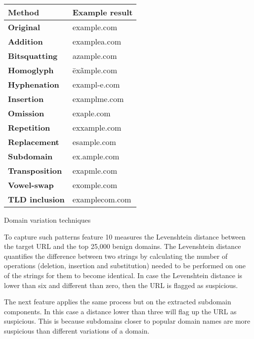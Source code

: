 \begin{singlespace}
	\begin{center}
		\label{tab:VARIATIONS_EXAMPLE}
		\begin{tabular}{ | m{13em} | m{13em} | }
			\hline
			\textbf{Method}        & \textbf{Example result} \\
			\hline
			\textbf{Original}      & example.com             \\
			\hline
			\textbf{Addition}      & examplea.com            \\
			\hline
			\textbf{Bitsquatting}  & azample.com             \\
			\hline
			\textbf{Homoglyph}     & ēxãmple.com             \\
			\hline
			\textbf{Hyphenation}   & exampl-e.com            \\
			\hline
			\textbf{Insertion}     & examplme.com            \\
			\hline
			\textbf{Omission}      & exaple.com              \\
			\hline
			\textbf{Repetition}    & exxample.com            \\
			\hline
			\textbf{Replacement}   & esample.com             \\
			\hline
			\textbf{Subdomain}     & ex.ample.com            \\
			\hline
			\textbf{Transposition} & exapmle.com             \\
			\hline
			\textbf{Vowel-swap}    & exomple.com             \\
			\hline
			\textbf{TLD inclusion} & examplecom.com          \\
			\hline
		\end{tabular}
		\captionsetup{type=table}\caption{Domain variation techniques}
	\end{center}
\end{singlespace}

To capture such patterns feature 10 measures the Levenshtein distance between the target URL and the top 25,000 benign domains. The Levenshtein distance quantifies the difference between two strings by calculating the number of operations (deletion, insertion and substitution) needed to be performed on one of the strings for them to become identical. In case the Levenshtein distance is lower than six and different than zero, then the URL is flagged as suspicious. 

The next feature applies the same process but on the extracted subdomain components. In this case a distance lower than three will flag up the URL as suspicious. This is because subdomains closer to popular domain names are more suspicious than different variations of a domain.

